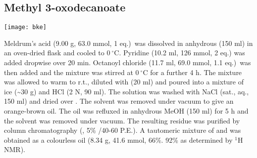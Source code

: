 \newpage

\subsection{Methyl 3-oxodecanoate }

\begin{scheme}[H]
	\begin{center}
		\texttt{[image: bke]}
	\end{center}
\end{scheme}

Meldrum's acid  (9.00 g, 63.0 mmol, 1 eq.)\ was dissolved in anhydrous  (150 ml) in an oven-dried flask and cooled to $0\ ^{\circ}$C. Pyridine (10.2 ml, 126 mmol, 2 eq.) was added dropwise over 20 min. Octanoyl chloride  (11.7 ml, 69.0 mmol, 1.1 eq.)\ was then added and the mixture was stirred at $0\ ^{\circ}$C for a further 4 h. 
The mixture was allowed to warm to r.t., diluted with  (20 ml) and poured into a mixture of ice (\textasciitilde 30 g) and HCl (2 N, 90 ml). The solution was washed with NaCl (sat., aq., 150 ml) and dried over . The solvent was removed under vacuum to give an orange-brown oil.
The oil was refluxed in anhydrous MeOH (150 ml) for 5 h and the solvent was removed under vacuum. The resulting residue was purified by column chromatography (, 5\% /40-60 P.E.). A tautomeric mixture of  and  was obtained as a colourless oil (8.34 g, 41.6 mmol, 66\%. 92\%  as determined by $^{1}$H NMR).

